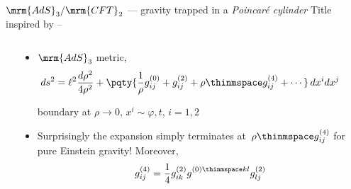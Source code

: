 \documentclass[aspectratio=169,10pt
	,noamsthm
]{beamer}
\begin{document}
\begin{frame}{$\mrm{AdS}_3/\mrm{CFT}_2$ --- gravity trapped in a \textit{Poincar\'e cylinder}}{%
	Title inspired by
	\textcite{Kraus:2021cwf} -- %
}
\begin{columns}
\begin{column}{.45\textwidth}
\figAdsCft
\end{column}
\begin{column}{.55\textwidth}
	\begin{itemize}
	\item $\mrm{AdS}_3$ metric,
	\begin{equation}
	\hspace{-2em}
		ds^2 = \ell^2 \frac{d\rho^2}{4 \rho^2} + \pqty{\frac{1}{\rho} g^{(0)}_{ij} + g^{(2)}_{ij} + \rho\thinmspace g^{(4)}_{ij} + \cdots}\, dx^i dx^j \label{fggauge}
	\end{equation}
	
	\vspace{-.5\baselineskip}
	boundary at $\rho \to 0$, $x^{i} \sim \varphi, t$, $i = 1,2$

\pause
	\item Surprisingly the expansion simply terminates at~$\rho\thinmspace g^{(4)}_{ij}$ for pure Einstein gravity! Moreover,
	\begin{equation}
		g^{(4)}_{ij} = \frac{1}{4} g^{(2)}_{ik} g^{(0)\thinmspace kl}_{\phantom{kl}} g^{(2)}_{lj}
	\end{equation}
	\textcite{Fefferman:2007rka,Banados:1998gg}
	\end{itemize}
\end{column}
\end{columns}
\end{frame}
\end{document}
